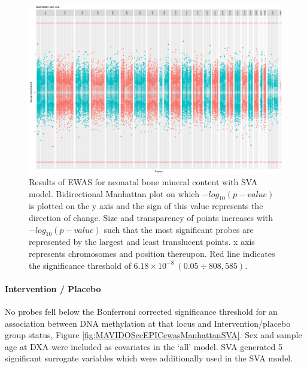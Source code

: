 \documentclass[
]{book}
\begin{document}
\begin{figure}

{\centering \includegraphics[width=0.8\linewidth]{figs/MAVIDOSbmcEPICewasManhattanSVA} 

}

\caption{Results of EWAS for neonatal bone mineral content with SVA model. Bidirectional Manhattan plot on which \(-log_{10}(p-value)\) is plotted on the y axis and the sign of this value represents the direction of change. Size and transparency of points increases with \(-log_{10}(p-value)\) such that the most significant probes are represented by the largest and least translucent points. x axis represents chromosomes and position thereupon. Red line indicates the significance threshold of \(6.18\times10^{-8}~(0.05\div808,585)\).}\label{fig:MAVIDOSbmcEPICewasManhattanSVA}
\end{figure}



\hypertarget{intervention-placebo}{%
\paragraph{Intervention / Placebo}\label{intervention-placebo}}

No probes fell below the Bonferroni corrected significance threshold for an association between DNA methylation at that locus and Intervention/placebo group status, Figure \ref{fig:MAVIDOSccEPICewasManhattanSVA}.
Sex and sample age at DXA were included as covariates in the `all' model.
SVA generated 5 significant surrogate variables which were additionally used in the SVA model.
\end{document}
